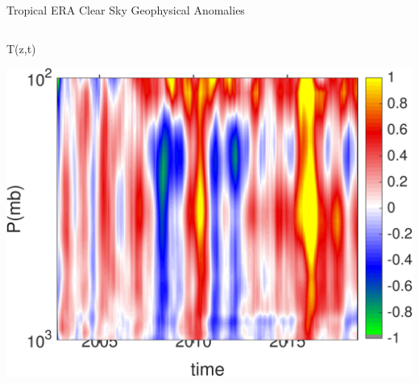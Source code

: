 \documentclass[10pt,t]{beamer}
\begin{document}

\begin{frame}{Tropical ERA Clear Sky Geophysical Anomalies}
\vspace{-0.35in}

\begin{columns}
\begin{column}{0.45\columnwidth}
\begin{block}{\footnotesize T(z,t)}
\vspace{-0.1in}
\begin{center}
\includegraphics[width=\linewidth]{Figs/ClearAnom/era_clr_ptemp_anom_200209_201808.png}
\end{center}
\end{block}
\end{column}


\end{columns}
\end{frame}
\end{document}
